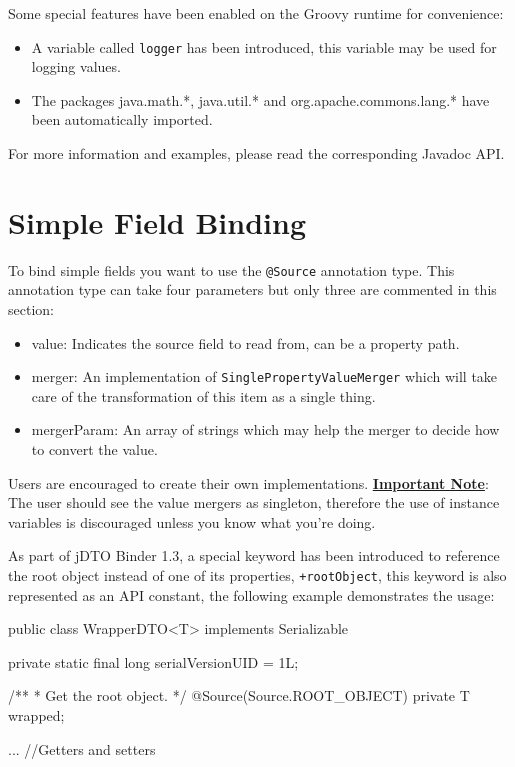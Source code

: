 \documentclass[11pt]{article}
\newcommand{\JDTO}{jDTO Binder\xspace}
\begin{document}
Some special features have been enabled on the Groovy runtime for convenience:

\begin{itemize}

\item A variable called \texttt{logger} has been introduced, this variable may be used for logging values.
\item The packages java.math.*, java.util.* and org.apache.commons.lang.* have been automatically imported.

\end{itemize}

For more information and examples, please read the corresponding Javadoc API.

\clearpage

\section{Simple Field Binding}


To bind simple fields you want to use the \texttt{@Source} annotation type.
This annotation type can take four parameters but only three are commented in this section:

\begin{itemize}
 \item value: Indicates the source field to read from, can be a property path.
 \item merger: An implementation of \texttt{SinglePropertyValueMerger} which will take care of the transformation of this item as a single thing.
 \item mergerParam: An array of strings which may help the merger to decide how to convert the value.
\end{itemize}

Users are encouraged to create their own implementations. \textbf{\underline{Important Note}}: The user should see
the value mergers as singleton, therefore the use of instance variables is discouraged unless you know what you're doing.

As part of \JDTO 1.3, a special keyword has been introduced to reference the root object instead of one of its properties, \texttt{+rootObject}, this keyword is also represented as an API constant, the following example demonstrates the usage:

\begin{java}

public class WrapperDTO<T> implements Serializable {
    
    private static final long serialVersionUID = 1L;
    
    /**
     * Get the root object.
     */
    @Source(Source.ROOT_OBJECT)
    private T wrapped;
    
    ... //Getters and setters
    
}
\end{java}
\end{document}
